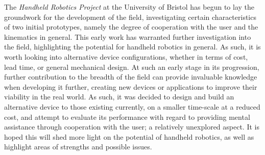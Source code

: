 \documentclass[11pt]{article}
\begin{document}
The \textit{Handheld Robotics Project} at the University of Bristol has begun to lay the groundwork for the development of the field, investigating certain characteristics of two initial prototypes, namely the degree of cooperation with the user and the kinematics in general. This early work has warranted further investigation into the field, highlighting the potential for handheld robotics in general. As such, it is worth looking into alternative device configurations, whether in terms of cost, lead time, or general mechanical design. At such an early stage in its progression, further contribution to the breadth of the field can provide invaluable knowledge when developing it further, creating new devices or applications to improve their viability in the real world. As such, it was decided to design and build an alternative device to those existing currently, on a smaller time-scale at a reduced cost, and attempt to evaluate its performance with regard to providing mental assistance through cooperation with the user; a relatively unexplored aspect. It is hoped this will shed more light on the potential of handheld robotics, as well as highlight areas of strengths and possible issues.
\end{document}
